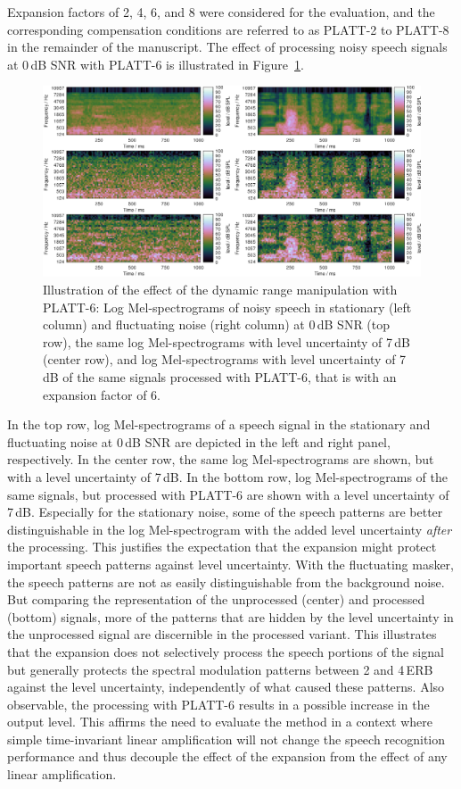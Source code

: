 \documentclass[10pt,a4paper,twocolumn]{article}
\begin{document}
Expansion factors of 2, 4, 6, and 8 were considered for the evaluation, and the corresponding compensation conditions are referred to as PLATT-2 to PLATT-8 in the remainder of the manuscript.
%
The effect of processing noisy speech signals at 0\,dB SNR with PLATT-6 is illustrated in Figure~\ref{fig:11}.
%
\begin{figure}
	\centerline{\includegraphics[width=1\textwidth]{images/signal-processed}}
	\caption{Illustration of the effect of the dynamic range manipulation with PLATT-6: Log Mel-spectrograms of noisy speech in stationary (left column) and fluctuating noise (right column) at 0\,dB SNR (top row), the same log Mel-spectrograms with level uncertainty of 7\,dB (center row), and log Mel-spectrograms with level uncertainty of 7\,dB of the same signals processed with PLATT-6, that is with an expansion factor of 6.}
	\label{fig:11}
\end{figure}
%
In the top row, log Mel-spectrograms of a speech signal in the stationary and fluctuating noise at 0\,dB SNR are depicted in the left and right panel, respectively.
%
In the center row, the same log Mel-spectrograms are shown, but with a level uncertainty of 7\,dB.
%
In the bottom row, log Mel-spectrograms of the same signals, but processed with PLATT-6 are shown with a level uncertainty of 7\,dB.
%
Especially for the stationary noise, some of the speech patterns are better distinguishable in the log Mel-spectrogram with the added level uncertainty \emph{after} the processing.
%
This justifies the expectation that the expansion might protect important speech patterns against level uncertainty.
%
With the fluctuating masker, the speech patterns are not as easily distinguishable from the background noise.
%
But comparing the representation of the unprocessed (center) and processed (bottom) signals, more of the patterns that are hidden by the level uncertainty in the unprocessed signal are discernible in the processed variant.
%
This illustrates that the expansion does not selectively process the speech portions of the signal but generally protects the spectral modulation patterns between 2 and 4\,ERB against the level uncertainty, independently of what caused these patterns.
%
Also observable, the processing with PLATT-6 results in a possible increase in the output level.
%
This affirms the need to evaluate the method in a context where simple time-invariant linear amplification will not change the speech recognition performance and thus decouple the effect of the expansion from the effect of any linear amplification.
\end{document}
